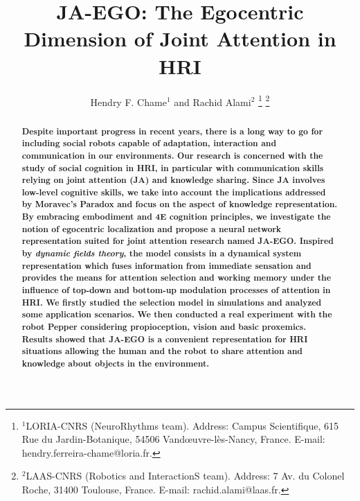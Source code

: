 \documentclass[letterpaper, 10 pt, conference]{ieeeconf}  %
\title{\LARGE \bf
	JA-EGO: The Egocentric Dimension of Joint Attention in HRI
}
\author{Hendry F. Chame$^{1}$ and Rachid Alami$^{2}$%
	\thanks{$^{1}$LORIA-CNRS (NeuroRhythms team). Address: Campus Scientifique, 615 Rue du Jardin-Botanique, 54506 Vand\oe uvre-l\`es-Nancy, France.
		{\small E-mail: hendry.ferreira-chame@loria.fr}.}%
	\thanks{$^{2}$LAAS-CNRS (Robotics and InteractionS team). Address: 7 Av. du Colonel Roche, 31400 Toulouse, France.
		{\small E-mail: rachid.alami@laas.fr}.}%
}
\begin{document}
		
	
	\maketitle
	\thispagestyle{empty}
	\pagestyle{empty}
	
	
	\begin{abstract}
		
		\small \bf Despite important progress in recent years, there is a long way to go for including social robots capable of adaptation, interaction and communication in our environments. Our research is concerned with the study of social cognition in HRI, in particular with communication skills relying on joint attention (JA) and knowledge sharing. Since JA involves low-level cognitive skills, we take into account the implications addressed by Moravec's Paradox and focus on the aspect of knowledge representation. By embracing embodiment and 4E cognition principles, we investigate the notion of egocentric localization and propose a neural network representation suited for joint attention research named JA-EGO. Inspired by \textit{dynamic fields theory}, the model consists in a dynamical system representation which fuses information from immediate sensation and provides the means for attention selection and working memory under the influence of top-down and bottom-up modulation processes of attention in HRI. We firstly studied the selection model in simulations and analyzed some application scenarios. We then conducted a real experiment with the robot Pepper considering propioception, vision and basic proxemics. Results showed that JA-EGO is a convenient representation for HRI situations allowing the human and the robot to share attention and knowledge about objects in the environment. 
		

\end{abstract}
\end{document}
